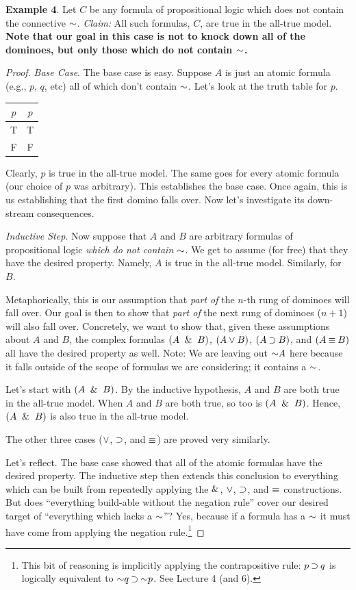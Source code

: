 \documentclass[options]{philosophersimprint}
\begin{document}
\textbf{Example 4}. Let $C$ be any formula of propositional logic which does not contain the connective $\mathord{\sim}$. \textit{Claim:} All such formulas, $C$, are true in the all-true model. \textbf{Note that our goal in this case is not to knock down all of the dominoes, but only those which do not contain $\mathord{\sim}$.}
\vspace{-0.3cm}\begin{proof}  \textit{Base Case}. The base case is easy. Suppose $A$ is just an atomic formula (e.g., $p$, $q$, etc) all of which don't contain $\mathord{\sim}$. Let's look at the truth table for $p$.
\begin{table}[h!]
        \centering
        \begin{tabular}{c|c}
             $p$ & $p$ \\
             \hline
             T & T\\
             F & F
        \end{tabular}
    \end{table}

Clearly, $p$ is true in the all-true model. The same goes for every atomic formula (our choice of $p$ was arbitrary). This establishes the base case. Once again, this is us establishing that the first domino falls over. Now let's investigate its down-stream consequences.

\textit{Inductive Step}. Now suppose that $A$ and $B$ are arbitrary formulas of propositional logic \textit{which do not contain $\mathord{\sim}$}. We get to assume (for free) that they have the desired property. Namely, $A$ is true in the all-true model. Similarly, for $B$.

Metaphorically, this is our assumption that \textit{part of} the $n$-th rung of dominoes will fall over. Our goal is then to show that \textit{part of} the next rung of dominoes ($n+1$) will also fall over. Concretely, we want to show that, given these assumptions about $A$ and $B$, the complex formulas $(A \ \mathbin{\&} \  B)$, $(A \mathbin{\vee} B)$, $(A \mathbin{\supset} B)$, and $(A \mathbin{\equiv} B)$ all have the desired property as well. Note: We are leaving out $\mathord{\sim} A$ here because it falls outside of the scope of formulas we are considering; it contains a $\mathord{\sim}$.

Let's start with $(A \ \mathbin{\&} \  B)$. By the inductive hypothesis, $A$ and $B$ are both true in the all-true model. When $A$ and $B$ are both true, so too is $(A \ \mathbin{\&} \  B)$. Hence, $(A \ \mathbin{\&} \  B)$ is also true in the all-true model.

The other three cases ($\mathbin{\vee}$, $\mathbin{\supset}$, and $\mathbin{\equiv}$) are proved very similarly.

Let's reflect. The base case showed that all of the atomic formulas have the desired property. The inductive step then extends this conclusion to everything which can be built from repeatedly applying the $\mathbin{\&}$, $\mathbin{\vee}$, $\mathbin{\supset}$, and $\mathbin{\equiv}$ constructions. But does ``everything build-able without the negation rule'' cover our desired target of ``everything which lacks a $\mathord{\sim}$''? Yes, because if a formula has a $\mathord{\sim}$ it must have come from applying the negation rule.\footnote{This bit of reasoning is implicitly applying the contrapositive rule: $p\mathbin{\supset} q$ is logically equivalent to $\mathord{\sim} q\mathbin{\supset} \mathord{\sim} p$. See Lecture 4 (and 6).}
\end{proof}
\end{document}
